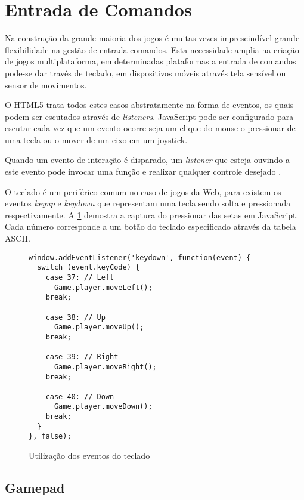 \section{Entrada de Comandos}
Na construção da grande maioria dos jogos é muitas vezes
imprescindível grande flexibilidade na gestão de entrada comandos.
Esta necessidade amplia na criação de jogos multiplataforma, em
determinadas plataformas a entrada de comandos pode-se dar través de
teclado, em dispositivos móveis através tela sensível ou sensor de
movimentos.

O HTML5 trata todos estes casos abstratamente na forma de eventos, os
quais podem ser escutados através de \textit{listeners}. JavaScript
pode ser configurado para escutar cada vez que um evento ocorre seja um
clique do mouse o pressionar de uma tecla ou o mover de um eixo em um
joystick.

Quando um evento de interação é disparado, um \textit{listener}
que esteja ouvindo a este evento pode invocar uma função e realizar
qualquer controle desejado \autocite{buildingHtml5Game}.

O teclado é um periférico comum no caso de jogos da Web, para existem
os eventos \textit{keyup} e \textit{keydown} que representam uma tecla
sendo solta e pressionada respectivamente. A \ref{fig:keyboardEvents}
demostra a captura do pressionar das setas em JavaScript. Cada
número corresponde a um botão do teclado especificado através da tabela ASCII.

\begin{figure}[H]
\centering
\begin{verbatim}
window.addEventListener('keydown', function(event) {
  switch (event.keyCode) {
    case 37: // Left
      Game.player.moveLeft();
    break;

    case 38: // Up
      Game.player.moveUp();
    break;

    case 39: // Right
      Game.player.moveRight();
    break;

    case 40: // Down
      Game.player.moveDown();
    break;
  }
}, false);
\end{verbatim}
\caption{Utilização dos eventos do teclado}
\label{fig:keyboardEvents}
\end{figure}

\subsection{Gamepad}


